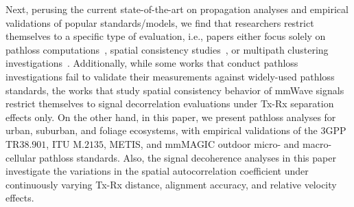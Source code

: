 \documentclass[12pt, draftcls, onecolumn]{IEEEtran}
\begin{document}
Next, perusing the current state-of-the-art on propagation analyses and empirical validations of popular standards/models, we find that researchers restrict themselves to a specific type of evaluation, i.e., papers either focus solely on pathloss computations~\cite{Qualcomm3GPP, MacCartneyModelsOverview, MacCartneyRural, FoliageSimulations, SuburbanGeometryJournal}, spatial consistency studies~\cite{SpatialConsistencyOriginal}, or multipath clustering investigations~\cite{QDC_NIST, D2DHumanBlockage}. Additionally, while some works that conduct pathloss investigations fail to validate their measurements against widely-used pathloss standards, the works that study spatial consistency behavior of mmWave signals restrict themselves to signal decorrelation evaluations under Tx-Rx separation effects only. On the other hand, in this paper, we present pathloss analyses for urban, suburban, and foliage ecosystems, with empirical validations of the $3$GPP TR$38.901$, ITU M$.2135$, METIS, and mmMAGIC outdoor micro- and macro-cellular pathloss standards. Also, the signal decoherence analyses in this paper investigate the variations in the spatial autocorrelation coefficient \cite{SpatialConsistencyOriginal} under continuously varying Tx-Rx distance, alignment accuracy, and relative velocity effects.
\end{document}
